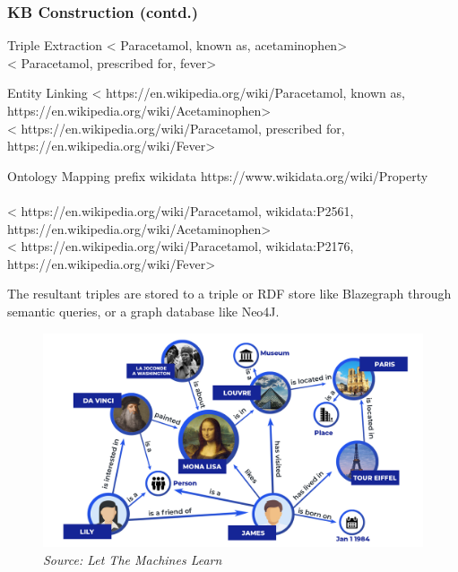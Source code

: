 \documentclass[t]{beamer}
\begin{document}
\begin{frame}
    \frametitle{KB Construction (contd.)}
    \begin{block}{Triple Extraction}
        \tiny{<{\color{red} Paracetamol}, {\color{teal} known as}, {\color{red} acetaminophen}>\\ <{\color{red} Paracetamol}, {\color{teal} prescribed for}, {\color{red} fever}>}
    \end{block}
    \begin{block}{Entity Linking}
        \tiny{<{\color{red} https://en.wikipedia.org/wiki/Paracetamol}, {\color{teal} known as}, {\color{red} https://en.wikipedia.org/wiki/Acetaminophen}>\\ <{\color{red} https://en.wikipedia.org/wiki/Paracetamol}, {\color{teal} prescribed for}, {\color{red} https://en.wikipedia.org/wiki/Fever}>}
    \end{block}
    \begin{block}{Ontology Mapping}
        \tiny{prefix {\color{teal} wikidata https://www.wikidata.org/wiki/Property}}\\~\\       \tiny{<{\color{red} https://en.wikipedia.org/wiki/Paracetamol}, {\color{teal} wikidata:P2561}, {\color{red} https://en.wikipedia.org/wiki/Acetaminophen}>\\ <{\color{red} https://en.wikipedia.org/wiki/Paracetamol}, {\color{teal} wikidata:P2176}, {\color{red} https://en.wikipedia.org/wiki/Fever}>}
    \end{block}
    \begin{itemize}
    \small{\item The resultant triples are stored to a triple or RDF store like Blazegraph through semantic queries, or a graph database like Neo4J.}
    \end{itemize}
\end{frame}

\begin{frame}[c]
    \begin{figure}[h]
    \includegraphics[width=120mm]{knowledge-graph-example.jpg}
    {\caption*{\tiny{\emph{Source: Let The Machines Learn}}}}
    \end{figure}
\end{frame}
\end{document}
